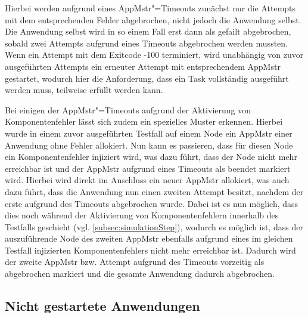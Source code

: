 Hierbei werden aufgrund eines \ac{AppMstr}"=Timeouts zunächst nur die Attempts mit dem entsprechenden Fehler abgebrochen, nicht jedoch die Anwendung selbst.
Die Anwendung selbst wird in so einem Fall erst dann als gefailt abgebrochen, sobald zwei Attempts aufgrund eines Timeouts abgebrochen werden mussten.
Wenn ein Attempt mit dem Exitcode -100 terminiert, wird unabhängig von zuvor ausgeführten Attempts ein erneuter Attempt mit entsprechendem \ac{AppMstr} gestartet, wodurch hier die Anforderung, dass ein Task vollständig ausgeführt werden muss, teilweise erfüllt werden kann.

Bei einigen der \ac{AppMstr}"=Timeouts aufgrund der Aktivierung von Komponentenfehler lässt sich zudem ein spezielles Muster erkennen.
Hierbei wurde in einem zuvor ausgeführten Testfall auf einem Node ein \ac{AppMstr} einer Anwendung ohne Fehler allokiert.
Nun kann es passieren, dass für diesen Node ein Komponentenfehler injiziert wird, was dazu führt, dass der Node nicht mehr erreichbar ist und der \ac{AppMstr} aufgrund eines Timeouts als beendet markiert wird.
Hierbei wird direkt im Anschluss ein neuer \ac{AppMstr} allokiert, was auch dazu führt, dass die Anwendung nun einen zweiten Attempt besitzt, nachdem der erste aufgrund des Timeouts abgebrochen wurde.
Dabei ist es nun möglich, dass dies noch während der Aktivierung von Komponentenfehlern innerhalb des Testfalls geschieht (vgl. \autoref{subsec:simulationStep}), wodurch es möglich ist, dass der auszuführende Node des zweiten \ac{AppMstr} ebenfalls aufgrund eines im gleichen Testfall injizierten Komponentenfehlers nicht mehr erreichbar ist.
Dadurch wird der zweite \ac{AppMstr} bzw. Attempt aufgrund des Timeouts vorzeitig als abgebrochen markiert und die gesamte Anwendung dadurch abgebrochen.

\subsection{Nicht gestartete Anwendungen}
\label{subsec:notStartedApps}

